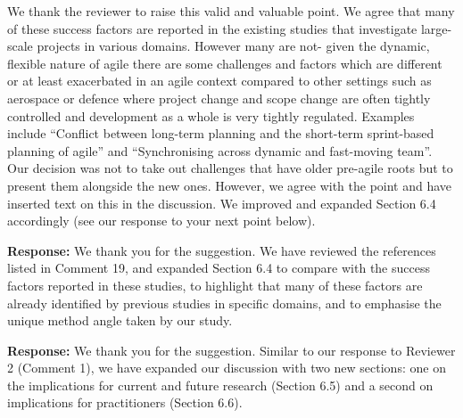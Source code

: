 \documentclass[a4paper,twoside,11pt]{reviewresponse}
\begin{document}
We thank the reviewer to raise this valid and valuable point. We agree that many of these success factors are reported in the existing studies that investigate large-scale projects in various domains. However many are not- given the dynamic, flexible nature of agile there are some challenges and factors which are different or at least exacerbated in an agile context compared to other settings such as aerospace or defence where project change and scope change are often tightly controlled and development as a whole is very tightly regulated. Examples include ``Conflict between long-term planning and the short-term sprint-based planning of agile'' and ``Synchronising across dynamic and fast-moving team''. Our decision was not to take out challenges that have older pre-agile roots but to present them alongside the new ones. However, we agree with the point and have inserted text on this in the discussion. We improved and expanded Section 6.4 accordingly (see our response to your next point below).%

\textbf{Response:}
We thank you for the suggestion. We have reviewed the references listed in Comment 19, and expanded Section 6.4 to compare with the success factors reported in these studies, to highlight that many of these factors are already identified by previous studies in specific domains, and to emphasise the unique method angle taken by our study.

\textbf{Response:}
We thank you for the suggestion. Similar to our response to Reviewer 2 (Comment 1), we have expanded our discussion with two new sections: one on the implications for current and future research (Section 6.5) and a second on implications for practitioners (Section 6.6).
\end{document}
